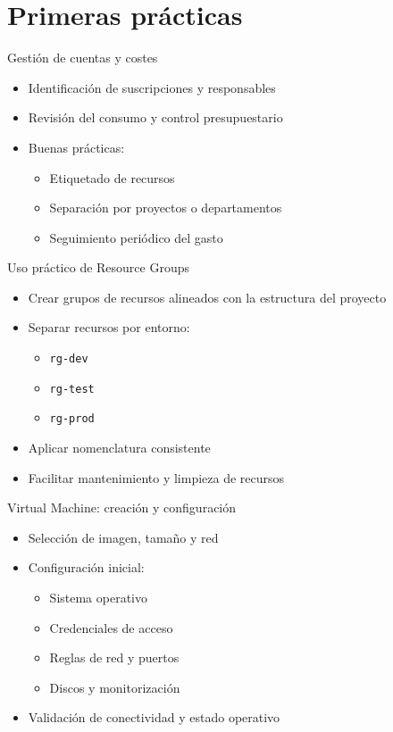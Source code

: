 \documentclass{beamer}
\begin{document}
\section{Primeras prácticas}

\begin{frame}{Gestión de cuentas y costes}
\begin{itemize}
    \item Identificación de suscripciones y responsables
    \item Revisión del consumo y control presupuestario
    \item Buenas prácticas:
    \begin{itemize}
        \item Etiquetado de recursos
        \item Separación por proyectos o departamentos
        \item Seguimiento periódico del gasto
    \end{itemize}
\end{itemize}
\end{frame}

\begin{frame}{Uso práctico de Resource Groups}
\begin{itemize}
    \item Crear grupos de recursos alineados con la estructura del proyecto
    \item Separar recursos por entorno:
    \begin{itemize}
        \item \texttt{rg-dev}
        \item \texttt{rg-test}
        \item \texttt{rg-prod}
    \end{itemize}
    \item Aplicar nomenclatura consistente
    \item Facilitar mantenimiento y limpieza de recursos
\end{itemize}
\end{frame}

\begin{frame}{Virtual Machine: creación y configuración}
\begin{itemize}
    \item Selección de imagen, tamaño y red
    \item Configuración inicial:
    \begin{itemize}
        \item Sistema operativo
        \item Credenciales de acceso
        \item Reglas de red y puertos
        \item Discos y monitorización
    \end{itemize}
    \item Validación de conectividad y estado operativo
\end{itemize}
\end{frame}
\end{document}
